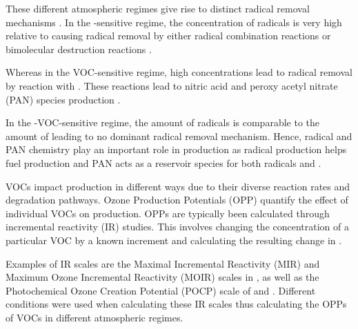 These different atmospheric regimes give rise to distinct radical removal mechanisms \citep{Kleinman:1991}. 
In the -sensitive regime, the concentration of radicals is very high relative to  causing radical removal by either radical combination reactions  or bimolecular destruction reactions  \citep{Kleinman:1994}.
\begin{reactionlist}
\end{reactionlist}
Whereas in the VOC-sensitive regime, high  concentrations lead to radical removal by reaction with . 
These reactions lead to nitric acid  and peroxy acetyl nitrate (PAN) species production .
\begin{reactionlist}
\end{reactionlist}
In the -VOC-sensitive regime, the amount of radicals is comparable to the amount of  leading to no dominant radical removal mechanism. 
Hence, radical and PAN chemistry play an important role in  production as radical production helps fuel  production and PAN acts as a reservoir species for both radicals and . 

VOCs impact  production in different ways due to their diverse reaction rates and degradation pathways. 
Ozone Production Potentials (OPP) quantify the effect of individual VOCs on  production. 
OPPs are typically been calculated through incremental reactivity (IR) studies. 
This involves changing the concentration of a particular VOC by a known increment and calculating the resulting change in . 

Examples of IR scales are the Maximal Incremental Reactivity (MIR) and Maximum Ozone Incremental Reactivity (MOIR) scales in \citet{Carter:1994}, as well as the Photochemical Ozone Creation Potential (POCP) scale of \citet{Derwent:1996} and \citet{Derwent:1998}. 
Different  conditions were used when calculating these IR scales thus calculating the OPPs of VOCs in different atmospheric regimes.


